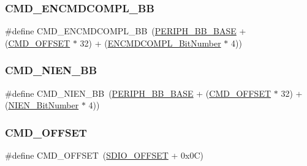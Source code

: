 \subsubsection{\texorpdfstring{CMD\_ENCMDCOMPL\_BB}{CMD\_ENCMDCOMPL\_BB}}
{\footnotesize\ttfamily \#define C\+M\+D\+\_\+\+E\+N\+C\+M\+D\+C\+O\+M\+P\+L\+\_\+\+BB~(\mbox{\hyperlink{group___peripheral__memory__map_gaed7efc100877000845c236ccdc9e144a}{P\+E\+R\+I\+P\+H\+\_\+\+B\+B\+\_\+\+B\+A\+SE}} + (\mbox{\hyperlink{group___s_d_i_o___private___types_definitions_gaf12d26702ce7a88d2a3dae87f000b75e}{C\+M\+D\+\_\+\+O\+F\+F\+S\+ET}} $\ast$ 32) + (\mbox{\hyperlink{group___s_d_i_o___private___types_definitions_ga1d1112c7b804791a0fffd8b317085aeb}{E\+N\+C\+M\+D\+C\+O\+M\+P\+L\+\_\+\+Bit\+Number}} $\ast$ 4))}

\mbox{\label{group___s_d_i_o___private___types_definitions_ga08623f1d053677de8b20a6f5f5090edd}} 
\subsubsection{\texorpdfstring{CMD\_NIEN\_BB}{CMD\_NIEN\_BB}}
{\footnotesize\ttfamily \#define C\+M\+D\+\_\+\+N\+I\+E\+N\+\_\+\+BB~(\mbox{\hyperlink{group___peripheral__memory__map_gaed7efc100877000845c236ccdc9e144a}{P\+E\+R\+I\+P\+H\+\_\+\+B\+B\+\_\+\+B\+A\+SE}} + (\mbox{\hyperlink{group___s_d_i_o___private___types_definitions_gaf12d26702ce7a88d2a3dae87f000b75e}{C\+M\+D\+\_\+\+O\+F\+F\+S\+ET}} $\ast$ 32) + (\mbox{\hyperlink{group___s_d_i_o___private___types_definitions_gab6d83a7ccd4a0d9ea9a09fec263fb25f}{N\+I\+E\+N\+\_\+\+Bit\+Number}} $\ast$ 4))}

\mbox{\label{group___s_d_i_o___private___types_definitions_gaf12d26702ce7a88d2a3dae87f000b75e}} 
\subsubsection{\texorpdfstring{CMD\_OFFSET}{CMD\_OFFSET}}
{\footnotesize\ttfamily \#define C\+M\+D\+\_\+\+O\+F\+F\+S\+ET~(\mbox{\hyperlink{group___s_d_i_o___private___types_definitions_gabf07aced03df5f46d57cea1d4f56d1e3}{S\+D\+I\+O\+\_\+\+O\+F\+F\+S\+ET}} + 0x0\+C)}


